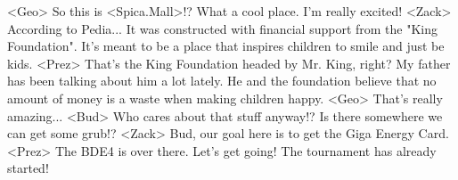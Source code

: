 <Geo> So this is <Spica.Mall>!? 
What a cool place. I'm really excited! 
<Zack> According to Pedia... 
It was constructed with financial support from the "King Foundation". 
It's meant to be a place that inspires children to smile and just be kids. 
<Prez> That's the King Foundation headed by Mr. King, right? 
My father has been talking about him a lot lately. 
He and the foundation believe that no amount of 
money is a waste when making children happy. 
<Geo> That's really amazing... 
<Bud> Who cares about that stuff anyway!? 
Is there somewhere we can get some grub!? 
<Zack> Bud, our goal here is to get the Giga Energy Card. 
<Prez> The {BD}{E4} is over there. Let's get going! 
The tournament has already started! 
